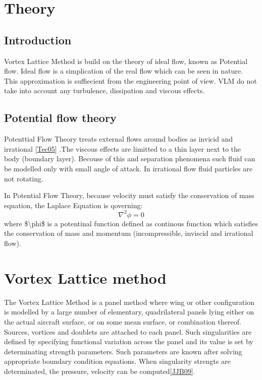 \documentclass[letterpaper,10pt,english]{jupyterBook}
\begin{document}
\chapter{Theory}
\label{\detokenize{chapters/theory:theory}}\label{\detokenize{chapters/theory::doc}}

\section{Introduction}
\label{\detokenize{chapters/theory:introduction}}
\sphinxAtStartPar
Vortex Lattice Method is build on the theory of ideal flow, known as Potential flow. Ideal flow is a simplication of the real flow which can be seen in nature. This  approximation is suffiecient from the engineering point of view. VLM do not take into account any turbulence, dissipation and viscous effects.


\section{Potential flow theory}
\label{\detokenize{chapters/theory:potential-flow-theory}}
\sphinxAtStartPar
Potenttial Flow Theory treats external flows around bodies as invicid and irrational {[}\hyperlink{cite.chapters/bibliography:id5}{Tec05}{]} .The viscous effects are limitted to a thin layer next to the body (boundary layer). Becouse of this and separation phenomena such fluid can be modelled only with small angle of attack. In irrational flow fluid particles are not rotating.

\sphinxAtStartPar
In Potential Flow Theory, because velocity must satisfy the conservation of mass equation, the Laplace Equation is qoverning:
\label{equation:chapters/theory:ebe07e2b-f09a-40d3-ac4f-4dba96e79d3a}\begin{equation}
\label{nabla}
\nabla^{2} \phi = 0
\end{equation}
\sphinxAtStartPar
where \$\textbackslash{}phi\$ is a potentinal function defined as continous function which satisfies the conservation of mass and momentum (incompressible, inviscid and irrational flow).


\chapter{Vortex Lattice method}
\label{\detokenize{chapters/theory:vortex-lattice-method}}
\sphinxAtStartPar
The Vortex Lattice Method is a panel method where wing or other configuration is modelled by a large number of elementary, quadrilateral panels lying either on the actual aircraft surface, or on some mean surface, or combination thereof. Sources, vortices and doublets are attached to each panel. Such singularities are defined by specifying functional variation across the panel and its value is set by determinating strength parameters. Such parameters are known after solving appropriate boundary condition equations. When singularity strengts are determinated, the pressure, velocity can be computed{[}\hyperlink{cite.chapters/bibliography:id4}{JJB09}{]}.
\end{document}

